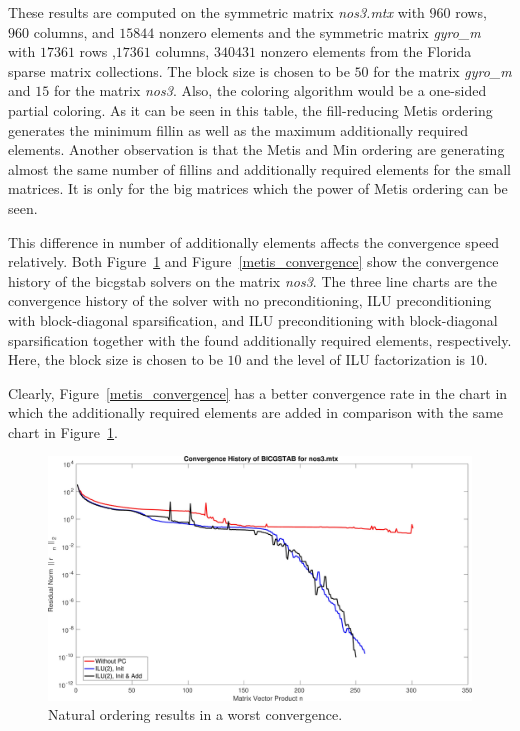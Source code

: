 \documentclass[12pt, oneside]{book}
\begin{document}
These results are computed on the symmetric matrix \textit{nos3.mtx} with $960$ rows, $960$ columns, and $15844$ nonzero elements and the symmetric matrix \textit{gyro\_m} with
$17361$ rows ,$17361$ columns, $340431$ nonzero elements from 
the Florida sparse matrix collections. The block size is
chosen to be $50$ for the matrix \textit{gyro\_m} and $15$ for 
the matrix \textit{nos3}. Also, the coloring algorithm would be a one-sided
partial coloring. As it can be seen in this table, the fill-reducing Metis ordering 
generates the minimum fillin as well as the maximum additionally required elements.
Another observation is that the Metis and Min ordering are generating almost the same
number of fillins and additionally required elements for the small matrices. 
It is only for the big matrices which the power of Metis ordering can be seen.

This difference in number of additionally elements affects the convergence speed
relatively. Both Figure~\ref{nat_convergence} and Figure~\ref{metis_convergence} show
the convergence history of the bicgstab solvers on the matrix \textit{nos3}.
The three line charts are the convergence history of the solver with
no preconditioning, ILU preconditioning with block-diagonal sparsification,
and ILU preconditioning with block-diagonal sparsification together with the found
additionally required elements, respectively.
Here, the block size is chosen to be $10$ and the level of ILU factorization
is $10$.

Clearly, Figure~\ref{metis_convergence} has a better convergence rate in the chart
in which the additionally required elements are added in comparison with the same 
chart in Figure~\ref{nat_convergence}.

\begin{figure}
\includegraphics[width=\linewidth]{nos3_mtx_convergence_nat}
\caption{Natural ordering results in a worst convergence.}
\label{nat_convergence}
\end{figure}
\end{document}
